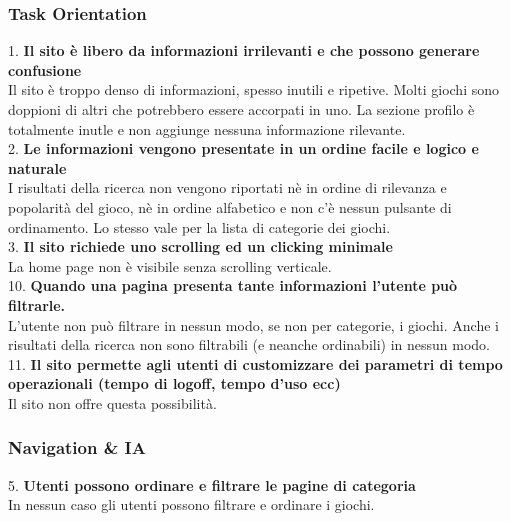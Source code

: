 \documentclass[../Report.tex]{subfiles}
\begin{document}
    \subsubsection{Task Orientation}
        1. \textbf{Il sito è libero da informazioni irrilevanti e che possono generare confusione}\\
            Il sito è troppo denso di informazioni, spesso inutili e ripetive. Molti giochi sono doppioni di altri che potrebbero essere accorpati in uno. La sezione profilo è totalmente inutle e non aggiunge nessuna informazione rilevante.  \\
        2. \textbf{Le informazioni vengono presentate in un ordine facile e logico e naturale}\\
        I risultati della ricerca non vengono riportati nè in ordine di rilevanza e popolarità del gioco, nè in ordine alfabetico e non c’è nessun pulsante di ordinamento. Lo stesso vale per la lista di categorie dei giochi. \\
        3. \textbf{Il sito richiede uno scrolling ed un clicking minimale }\\
        La home page non è visibile senza scrolling verticale.\\ 
        10. \textbf{Quando una pagina presenta tante informazioni l’utente può filtrarle.}\\
        L’utente non può filtrare in nessun modo, se non per categorie, i giochi. Anche i risultati della ricerca non sono filtrabili (e neanche ordinabili) in nessun modo.\\
        11. \textbf{Il sito permette agli utenti di customizzare dei parametri di tempo operazionali (tempo di logoff, tempo d’uso ecc)}\\
        Il sito non offre questa possibilità.
    
    \subsubsection{Navigation \& IA}
        5. \textbf{Utenti possono ordinare e filtrare le pagine di categoria}\\In nessun caso gli utenti possono filtrare e ordinare i giochi.
\end{document}
